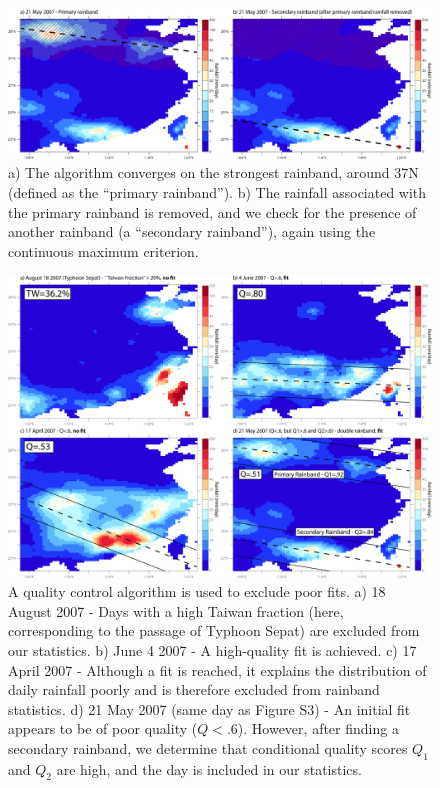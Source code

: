 \documentclass[final,grl]{agutexSI}
\begin{document}
\begin{figure}

\noindent\includegraphics[width=36pc]{Figures/S3}
\caption{a) The algorithm converges on the strongest rainband, around 37N (defined as the ``primary rainband''). b) The rainfall associated with the primary rainband is removed, and we check for the presence of another rainband (a ``secondary rainband''), again using the continuous maximum criterion.}
\end{figure}

\begin{figure}

\noindent\includegraphics[width=36pc]{Figures/S4}
\caption{A quality control algorithm is used to exclude poor fits. a) 18 August 2007 - Days with a high Taiwan fraction (here, corresponding to the passage of Typhoon Sepat) are excluded from our statistics. b) June 4 2007 - A high-quality fit is achieved. c) 17 April 2007 - Although a fit is reached, it explains the distribution of daily rainfall poorly and is therefore excluded from rainband statistics. d) 21 May 2007 (same day as Figure S3) - An initial fit appears to be of poor quality ($Q<.6$). However, after finding a secondary rainband, we determine that conditional quality scores $Q_1$ and $Q_2$ are high, and the day is included in our statistics.}
\end{figure}
\end{document}
